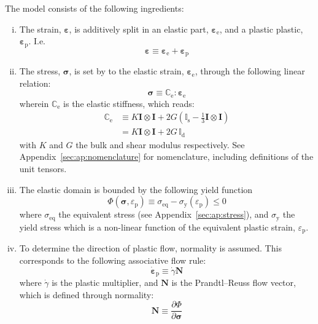 \documentclass[times]{goose-article}
\begin{document}
The model consists of the following ingredients:
\begin{enumerate}[(i)]
\item The strain, $\bm{\varepsilon}$, is additively split in an elastic part, $\bm{\varepsilon}_\mathrm{e}$, and a plastic plastic, $\bm{\varepsilon}_\mathrm{p}$. I.e.
\begin{equation}
  \bm{\varepsilon} \equiv \bm{\varepsilon}_\mathrm{e} + \bm{\varepsilon}_\mathrm{p}
\end{equation}
\item The stress, $\bm{\sigma}$, is set by to the elastic strain, $\bm{\varepsilon}_\mathrm{e}$, through the following linear relation:
\begin{equation}
  \bm{\sigma} \equiv \mathbb{C}_\mathrm{e} : \bm{\varepsilon}_\mathrm{e}
\end{equation}
wherein $\mathbb{C}_\mathrm{e}$ is the elastic stiffness, which reads:
\begin{align}
  \mathbb{C}_\mathrm{e}
  &\equiv K \bm{I} \otimes \bm{I}
   + 2 G (\mathbb{I}_\mathrm{s} - \tfrac{1}{3} \bm{I} \otimes \bm{I} )
  \\
  &= K \bm{I} \otimes \bm{I}
  + 2 G \, \mathbb{I}_\mathrm{d}
\end{align}
with $K$ and $G$ the bulk and shear modulus respectively. See Appendix~\ref{sec:ap:nomenclature} for nomenclature, including definitions of the unit tensors.
\item The elastic domain is bounded by the following yield function
\begin{equation}
  \Phi( \bm{\sigma} , \varepsilon_\mathrm{p} ) \equiv \sigma_\mathrm{eq} - \sigma_\mathrm{y} (\varepsilon_\mathrm{p}) \leq 0
\end{equation}
where $\sigma_\mathrm{eq}$ the equivalent stress (see Appendix~\ref{sec:ap:stress}), and $\sigma_\mathrm{y}$ the yield stress which is a non-linear function of the equivalent plastic strain, $\varepsilon_\mathrm{p}$.
\item To determine the direction of plastic flow, normality is assumed. This corresponds to the following associative flow rule:
\begin{equation}
  \dot{\bm{\varepsilon}}_\mathrm{p} \equiv \dot{\gamma} \bm{N}
\end{equation}
where $\dot{\gamma}$ is the plastic multiplier, and $\bm{N}$ is the Prandtl--Reuss flow vector, which is defined through normality:
\begin{equation}
  \bm{N} \equiv \frac{\partial \Phi}{\partial \bm{\sigma}}

\end{equation}
\end{enumerate}
\end{document}
